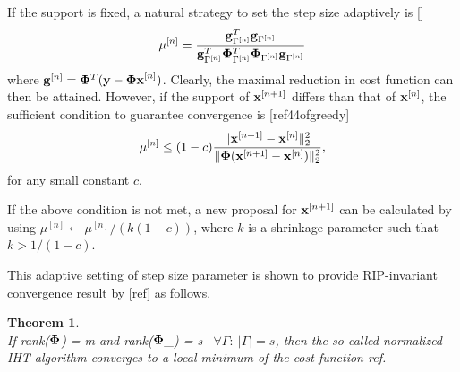 \documentclass{article}
\newtheorem{theorem}{Theorem}
\begin{document}
If the support is fixed, a natural strategy to set the step size adaptively is []
\begin{equation}\label{step_size}
   \mu^{[n]} = \frac{{\bf g}^T_{\Gamma^{[n]}}{\bf g}_{\Gamma^{[n]}}}{{\bf g}^T_{\Gamma^{[n]}}{\bf \Phi}^T_{\Gamma^{[n]}}{\bf \Phi}_{\Gamma^{[n]}}{\bf g}_{\Gamma^{[n]}}}
\end{equation}
where ${\bf g}^{[n]} = {\bf \Phi}^T({\bf y}-{\bf \Phi x}^{[n]})$. Clearly, the maximal reduction in cost function can then be attained. However, if the support of ${\bf x}^{[n+1]}$ differs than that of ${\bf x}^{[n]}$, the sufficient condition to guarantee convergence is [ref44ofgreedy]
\begin{equation}
    \mu^{[n]} \leq(1-c) \frac{\|{\bf x}^{[n+1]}-{\bf x}^{[n]} \|_2^2}{\|{\bf \Phi}({\bf x}^{[n+1]}-{\bf x}^{[n]}) \|_2^2},
\end{equation}
for any small constant $c$.

If the above condition is not met, a new proposal for ${\bf x}^{[n+1]}$ can be calculated by using $\mu^{[n]}\leftarrow{\mu^{[n]}/(k(1-c))}$, where $k$ is a shrinkage parameter such that $k>1/(1-c)$.

This adaptive setting of step size parameter is shown to provide RIP-invariant convergence result by [ref] as follows.
\begin{theorem}
{\rm{\cite{niht}}}\\
If rank({${\bf \Phi}$}) = m and rank(${\bf \Phi}$_{\Gamma}) = s \ $\forall \Gamma:\ |\Gamma| = s$, then the so-called normalized IHT algorithm converges to a local minimum of the cost function ref.
\end{theorem}
\end{document}
